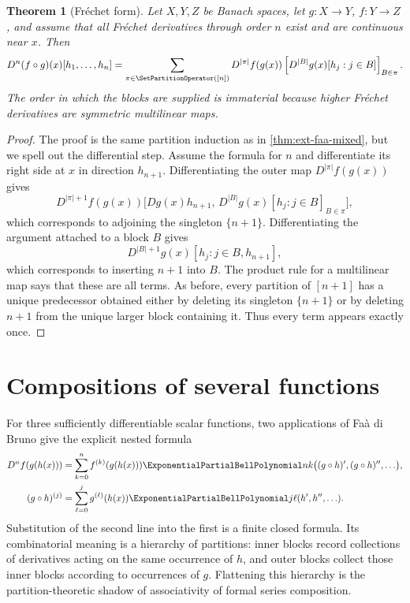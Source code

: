 \documentclass[11pt,a4paper,oneside,openany]{book}
\newtheorem{theorem}{Theorem}[chapter]
\theoremstyle{definition}
\theoremstyle{remark}
\begin{document}
\begin{theorem}[Fr\'echet form]
\label{thm:ext-faa-frechet}
Let \(X,Y,Z\) be Banach spaces, let \(g:X\to Y\), \(f:Y\to Z\), and assume
that all Fr\'echet derivatives through order \(n\) exist and are continuous near
\(x\).  Then
\begin{equation}\label{eq:ext-faa-frechet}
 D^n(f\circ g)(x)[h_1,\ldots,h_n]
 =\sum_{\pi\in\SetPartitionOperator([n])}
 D^{|\pi|}f(g(x))
 \left[
   D^{|B|}g(x)[h_j:j\in B]
 \right]_{B\in\pi}.
\end{equation}
The order in which the blocks are supplied is immaterial because higher
Fr\'echet derivatives are symmetric multilinear maps.
\end{theorem}
\begin{proof}
The proof is the same partition induction as in
\cref{thm:ext-faa-mixed}, but we spell out the differential step.  Assume the
formula for \(n\) and differentiate its right side at \(x\) in direction
\(h_{n+1}\).  Differentiating the outer map
\(D^{|\pi|}f(g(x))\) gives
\[
 D^{|\pi|+1}f(g(x))
 \bigl[Dg(x)h_{n+1},\,D^{|B|}g(x)[h_j:j\in B]_{B\in\pi}\bigr],
\]
which corresponds to adjoining the singleton \(\{n+1\}\).  Differentiating
the argument attached to a block \(B\) gives
\[
 D^{|B|+1}g(x)[h_j:j\in B, h_{n+1}],
\]
which corresponds to inserting \(n+1\) into \(B\).  The product rule for a
multilinear map says that these are all terms.  As before, every partition of
\([n+1]\) has a unique predecessor obtained either by deleting its singleton
\(\{n+1\}\) or by deleting \(n+1\) from the unique larger block containing it.
Thus every term appears exactly once.
\end{proof}

\section{Compositions of several functions}

For three sufficiently differentiable scalar functions, two applications of
Fa\`a di Bruno give the explicit nested formula
\begin{align}
 D^n f(g(h(x)))
 &=\sum_{k=0}^n f^{(k)}(g(h(x)))
 \ExponentialPartialBellPolynomial nk\bigl((g\circ h)',(g\circ h)'',\ldots\bigr),
 \label{eq:ext-three-composition-outer}\\
 (g\circ h)^{(j)}
 &=\sum_{\ell=0}^j g^{(\ell)}(h(x))
 \ExponentialPartialBellPolynomial j\ell(h',h'',\ldots).
 \label{eq:ext-three-composition-inner}
\end{align}
Substitution of the second line into the first is a finite closed formula.  Its
combinatorial meaning is a hierarchy of partitions: inner blocks record
collections of derivatives acting on the same occurrence of \(h\), and outer
blocks collect those inner blocks according to occurrences of \(g\).  Flattening
this hierarchy is the partition-theoretic shadow of associativity of formal
series composition.
\end{document}
